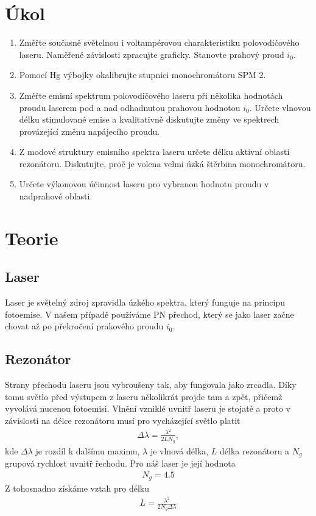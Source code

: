 \documentclass[a4paper,12pt]{article}
\begin{document}
\newcommand{\st}{^{\circ}}

\section{Úkol}

\begin{enumerate}
    \item Změřte současně světelnou i voltampérovou charakteristiku polovodičového laseru. Naměřené závislosti zpracujte graficky. Stanovte prahový proud $i_0$.
    \item Pomocí Hg výbojky okalibrujte stupnici monochromátoru SPM 2.
    \item Změřte emisní spektrum polovodičového laseru při několika hodnotách proudu laserem pod a nad odhadnutou prahovou hodnotou $i_0$. Určete vlnovou délku stimulované emise a kvalitativně diskutujte změny ve spektrech provázející změnu napájecího proudu.
    \item Z modové struktury emisního spektra laseru určete délku aktivní oblasti rezonátoru. Diskutujte, proč je volena velmi úzká štěrbina monochromátoru.
    \item Určete výkonovou účinnost laseru pro vybranou hodnotu proudu v nadprahové oblasti. 
\end{enumerate}

\section{Teorie}
\subsection{Laser}
Laser je světelný zdroj zpravidla úzkého spektra, který funguje na principu fotoemise. V našem případě používáme PN přechod, který se jako laser začne chovat až po překročení prakového proudu $i_0$.

\subsection{Rezonátor}
Strany přechodu laseru jsou vybroušeny tak, aby fungovala jako zrcadla. Díky tomu světlo před výstupem z laseru několikrát projde tam a zpět, přičemž vyvolává nucenou fotoemisi. Vlnění vzniklé uvnitř laseru je stojaté a proto v závislosti na délce rezonátoru musí pro vycházející světlo platit
\begin{eqnarray}
\Delta\lambda=\frac{\lambda^2}{2LN_g},
\end{eqnarray}
kde $\Delta\lambda$ je rozdíl k dalšímu maximu, $\lambda$ je vlnová délka, $L$ délka rezonátoru a $N_g$ grupová rychlost uvnitř řechodu. Pro náš laser je její hodnota
\begin{eqnarray}
N_g=4.5
\end{eqnarray}
Z tohosnadno získáme vztah pro délku
\begin{eqnarray}
L=\frac{\lambda^2}{2N_g\Delta\lambda}
\label{L}
\end{eqnarray}
\end{document}

